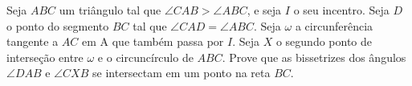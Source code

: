 Seja $ABC$ um triângulo tal que $\angle CAB > \angle ABC$, e seja $I$ o seu incentro.
Seja $D$ o ponto do segmento $BC$ tal que $\angle CAD = \angle ABC$. Seja $\omega$ a circunferência tangente a $AC$ em A que também passa por $I$. Seja $X$ o segundo ponto de interseção entre $\omega$ e o circuncírculo de $ABC$. Prove que as bissetrizes dos ângulos $\angle DAB$ e $\angle CXB$ se intersectam em um ponto na reta $BC$.
